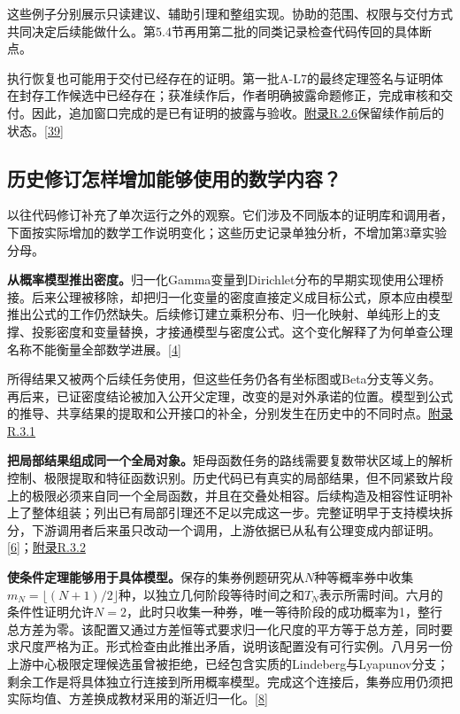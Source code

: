 这些例子分别展示只读建议、辅助引理和整组实现。协助的范围、权限与交付方式共同决定后续能做什么。第5.4节再用第二批的同类记录检查代码传回的具体断点。

执行恢复也可能用于交付已经存在的证明。第一批A-L7的最终定理签名与证明体在封存工作候选中已经存在；获准续作后，作者明确披露命题修正，完成审核和交付。因此，追加窗口完成的是已有证明的披露与验收。\href{zh-appendix.pdf\#r2-6}{附录R.2.6}保留续作前后的状态。\hyperlink{ref-39}{\mbox{[39]}}

\subsection[历史修订怎样增加能够使用的数学内容？]{\texorpdfstring{\protect\hypertarget{section-4-4}{}历史修订怎样增加能够使用的数学内容？}{历史修订怎样增加能够使用的数学内容？}}
以往代码修订补充了单次运行之外的观察。它们涉及不同版本的证明库和调用者，下面按实际增加的数学工作说明变化；这些历史记录单独分析，不增加第3章实验分母。

\textbf{从概率模型推出密度。}归一化Gamma变量到Dirichlet分布的早期实现使用公理桥接。后来公理被移除，却把归一化变量的密度直接定义成目标公式，原本应由模型推出公式的工作仍然缺失。后续修订建立乘积分布、归一化映射、单纯形上的支撑、投影密度和变量替换，才接通模型与密度公式。这个变化解释了为何单查公理名称不能衡量全部数学进展。\hyperlink{ref-4}{\mbox{[4]}}

所得结果又被两个后续任务使用，但这些任务仍各有坐标图或Beta分支等义务。再后来，已证密度结论被加入公开父定理，改变的是对外承诺的位置。模型到公式的推导、共享结果的提取和公开接口的补全，分别发生在历史中的不同时点。\href{zh-appendix.pdf\#r3-1}{附录R.3.1}

\textbf{把局部结果组成同一个全局对象。}矩母函数任务的路线需要复数带状区域上的解析控制、极限提取和特征函数识别。历史代码已有真实的局部结果，但不同紧致片段上的极限必须来自同一个全局函数，并且在交叠处相容。后续构造及相容性证明补上了整体组装；列出已有局部引理还不足以完成这一步。完整证明早于支持模块拆分，下游调用者后来虽只改动一个调用，上游依据已从私有公理变成内部证明。\hyperlink{ref-6}{\mbox{[6]}}；\href{zh-appendix.pdf\#r3-2}{附录R.3.2}

\textbf{使条件定理能够用于具体模型。}保存的集券例题研究从$N$种等概率券中收集$m_N=\lfloor(N+1)/2\rfloor$种，以独立几何阶段等待时间之和$T_N$表示所需时间。六月的条件性证明允许$N=2$，此时只收集一种券，唯一等待阶段的成功概率为1，整行总方差为零。该配置又通过方差恒等式要求归一化尺度的平方等于总方差，同时要求尺度严格为正。形式检查由此推出矛盾，说明该配置没有可行实例。八月另一份上游中心极限定理候选虽曾被拒绝，已经包含实质的Lindeberg与Lyapunov分支；剩余工作是将具体独立行连接到所用概率模型。完成这个连接后，集券应用仍须把实际均值、方差换成教材采用的渐近归一化。\hyperlink{ref-8}{\mbox{[8]}}


